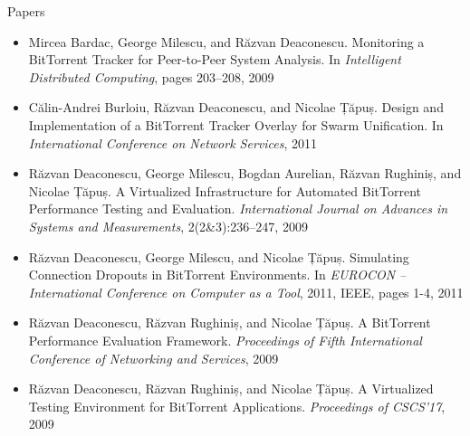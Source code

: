\documentclass{beamer}
\begin{document}
\begin{frame}{Papers}
  \begin{itemize}
    \scriptsize
    \item Mircea Bardac, George Milescu, and Răzvan Deaconescu. Monitoring a
    BitTorrent Tracker for Peer-to-Peer System Analysis. In \textit{Intelligent
    Distributed Computing}, pages 203--208, 2009
    \item Călin-Andrei Burloiu, Răzvan Deaconescu, and Nicolae Țăpuș. Design and
    Implementation of a BitTorrent Tracker Overlay for Swarm Unification. In
    \textit{International Conference on Network Services}, 2011
    \item Răzvan Deaconescu, George Milescu, Bogdan Aurelian, Răzvan Rughiniș,
    and Nicolae Țăpuș. A Virtualized Infrastructure for Automated BitTorrent
    Performance Testing and Evaluation. \textit{International Journal on
    Advances in Systems and Measurements}, 2(2\&3):236--247, 2009
    \item Răzvan Deaconescu, George Milescu, and Nicolae Țăpuș. Simulating
    Connection Dropouts in BitTorrent Environments. In \textit{EUROCON --
    International Conference on Computer as a Tool}, 2011, IEEE, pages 1-4, 2011
    \item Răzvan Deaconescu, Răzvan Rughiniș, and Nicolae Țăpuș. A BitTorrent
    Performance Evaluation Framework. \textit{Proceedings of Fifth International
    Conference of Networking and Services}, 2009
    \item Răzvan Deaconescu, Răzvan Rughiniș, and Nicolae Țăpuș. A Virtualized
    Testing Environment for BitTorrent Applications. \textit{Proceedings of
    CSCS'17}, 2009
  \end{itemize}
\end{frame}
\end{document}
